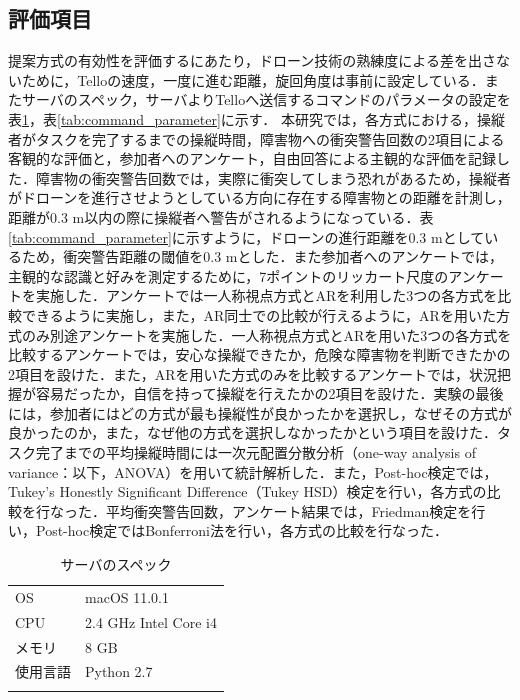 \documentclass[submit,techrep]{ipsj}
\begin{document}
\subsection{評価項目}
提案方式の有効性を評価するにあたり，ドローン技術の熟練度による差を出さないために，Telloの速度，一度に進む距離，旋回角度は事前に設定している．またサーバのスペック，サーバよりTelloへ送信するコマンドのパラメータの設定を表\ref{tab:server_spec}，表\ref{tab:command_parameter}に示す．
本研究では，各方式における，操縦者がタスクを完了するまでの操縦時間，障害物への衝突警告回数の2項目による客観的な評価と，参加者へのアンケート，自由回答による主観的な評価を記録した．障害物の衝突警告回数では，実際に衝突してしまう恐れがあるため，操縦者がドローンを進行させようとしている方向に存在する障害物との距離を計測し，距離が0.3 m以内の際に操縦者へ警告がされるようになっている．表\ref{tab:command_parameter}に示すように，ドローンの進行距離を0.3 mとしているため，衝突警告距離の閾値を0.3 mとした．また参加者へのアンケートでは，主観的な認識と好みを測定するために，7ポイントのリッカート尺度のアンケートを実施した．アンケートでは一人称視点方式とARを利用した3つの各方式を比較できるように実施し，また，AR同士での比較が行えるように，ARを用いた方式のみ別途アンケートを実施した．一人称視点方式とARを用いた3つの各方式を比較するアンケートでは，安心な操縦できたか，危険な障害物を判断できたかの2項目を設けた．また，ARを用いた方式のみを比較するアンケートでは，状況把握が容易だったか，自信を持って操縦を行えたかの2項目を設けた．実験の最後には，参加者にはどの方式が最も操縦性が良かったかを選択し，なぜその方式が良かったのか，また，なぜ他の方式を選択しなかったかという項目を設けた．タスク完了までの平均操縦時間には一次元配置分散分析（one-way analysis of variance：以下，ANOVA）を用いて統計解析した．また，Post-hoc検定では，Tukey’s Honestly Significant Difference（Tukey HSD）検定を行い，各方式の比較を行なった．平均衝突警告回数，アンケート結果では，Friedman検定を行い，Post-hoc検定ではBonferroni法を行い，各方式の比較を行なった．



 \begin{table}[tb]
  \caption{サーバのスペック}
  \label{tab:server_spec}
  \centering
  \begin{tabular}{ll}
  \noalign{\smallskip}\hline\noalign{\smallskip}
    OS     & macOS 11.0.1       \\
    CPU     & 2.4 GHz Intel Core i4       \\
    メモリ     & 8 GB       \\ 
    使用言語     & Python 2.7       \\
    \noalign{\smallskip}\hline
  \end{tabular}
\end{table}
\end{document}
